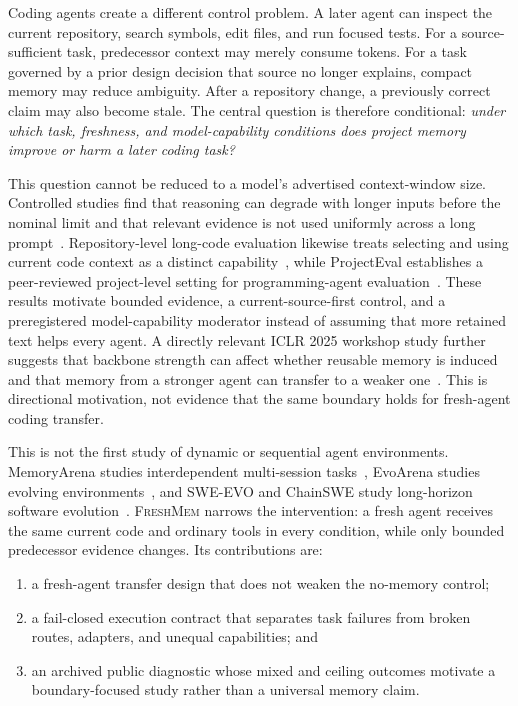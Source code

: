 \documentclass[10pt,conference]{IEEEtran}
\newcommand{\bench}{\textsc{FreshMem}}
\begin{document}
Coding agents create a different control problem. A later agent can inspect the
current repository, search symbols, edit files, and run focused tests. For a
source-sufficient task, predecessor context may merely consume tokens. For a
task governed by a prior design decision that source no longer explains, compact
memory may reduce ambiguity. After a repository change, a previously correct
claim may also become stale. The central question is therefore conditional:
\emph{under which task, freshness, and model-capability conditions does project
memory improve or harm a later coding task?}

This question cannot be reduced to a model's advertised context-window size.
Controlled studies find that reasoning can degrade with longer inputs before the
nominal limit and that relevant evidence is not used uniformly across a long
prompt~\cite{liu2024lostmiddle,levy2024sametask}. Repository-level long-code
evaluation likewise treats selecting and using current code context as a
distinct capability~\cite{li2025longcodeu}, while ProjectEval establishes a
peer-reviewed project-level setting for programming-agent evaluation~\cite{liu2025projecteval}.
These results motivate bounded
evidence, a current-source-first control, and a preregistered model-capability
moderator instead of assuming that more retained text helps every agent.
A directly relevant ICLR 2025 workshop study further suggests that backbone
strength can affect whether reusable memory is induced and that memory from a
stronger agent can transfer to a weaker one~\cite{shah2025preconditions}. This
is directional motivation, not evidence that the same boundary holds for
fresh-agent coding transfer.

This is not the first study of dynamic or sequential agent environments.
MemoryArena studies interdependent multi-session tasks~\cite{he2026memoryarena},
EvoArena studies evolving environments~\cite{xu2026evoarena}, and SWE-EVO and
ChainSWE study long-horizon software evolution~\cite{le2025sweevo,jin2026chainswe}.
\bench{} narrows the intervention: a fresh agent receives the same current
code and ordinary tools in every condition, while only bounded predecessor
evidence changes. Its contributions are:

\begin{enumerate}
  \item a fresh-agent transfer design that does not weaken the no-memory control;
  \item a fail-closed execution contract that separates task failures from
  broken routes, adapters, and unequal capabilities; and
  \item an archived public diagnostic whose mixed and ceiling outcomes motivate
  a boundary-focused study rather than a universal memory claim.
\end{enumerate}
\end{document}
